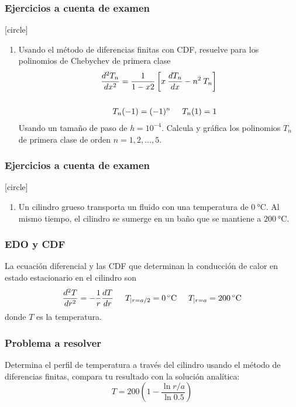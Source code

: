 \begin{frame}
\frametitle{Ejercicios a cuenta de examen}
[circle]
\begin{enumerate}[<+->]
\conti
\item Usando el método de diferencias finitas con CDF, resuelve para los polinomios de Chebychev de primera clase
\[ \begin{split} \dfrac{d^{2} T_{n}}{d x^{2}} = \dfrac{1}{1 - x{2}} \left[ x \: \dfrac{d T_{n}}{d x} - n^{2} \: T_{n} \right] \\
\\
T_{n}(-1) = (-1)^{n} \hspace{0.5cm} T_{n}(1) = 1
\end{split} \]
Usando un tamaño de paso de $h = 10^{-4}$. Calcula y gráfica los polinomios $T_{n}$ de primera clase de orden $n = 1, 2, \ldots, 5$.
\seti
\end{enumerate}
\end{frame}
\begin{frame}
\frametitle{Ejercicios a cuenta de examen}
[circle]
\begin{enumerate}[<+->]
\conti
\item Un cilindro grueso transporta un fluido con una temperatura de $\SI{0}{\celsius}$. Al mismo tiempo, el cilindro se sumerge en un baño que se mantiene a $\SI{200}{\celsius}$.
\end{enumerate}
\begin{figure}
	\centering
	
\end{figure}
\end{frame}
\begin{frame}
\frametitle{EDO y CDF}
La ecuación diferencial y las CDF que determinan la conducción de calor en estado estacionario en el cilindro son
\[ \dfrac{d^{2} T}{d r^{2}} = -\dfrac{1}{r} \dfrac{d T}{d r} \hspace{0.5cm} T_{\vert r = a/2} = \SI{0}{\celsius} \hspace{0.5cm} T_{\vert r = a} = \SI{200}{\celsius} \]
donde $T$ es la temperatura.
\end{frame}
\begin{frame}
\frametitle{Problema a resolver}
Determina el perfil de temperatura a través del cilindro usando el método de diferencias finitas, compara tu resultado con la solución analítica:
\[ T =  200 \left( 1 - \dfrac{\ln r/a}{\ln 0.5} \right) \]
\end{frame}
